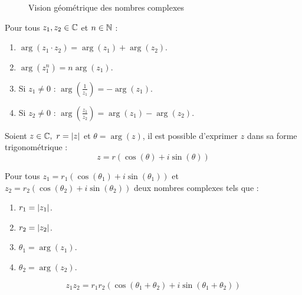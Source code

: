 \begin{figure}[!h]
	\centering
	\caption{Vision géométrique des nombres complexes}
\end{figure}

\begin{proposition}
	Pour tous $z_1, z_2 \in \mathbb{C}$ et $n \in \mathbb{N}$ :
	\begin{enumerate}
		\item $\arg(z_1 \cdot z_2) = \arg(z_1) + \arg(z_2)$.
		\item $\arg(z_1^n) = n \arg(z_1)$.
		\item Si $z_1 \neq 0$ : $\arg \left(\frac{1}{z_1} \right) = - \arg(z_1)$.
		\item Si $z_2 \neq 0$ : $\arg \left( \frac{z_1}{z_2} \right) = \arg(z_1) - \arg(z_2)$.
	\end{enumerate}
\end{proposition}

\begin{definition}
	Soient $z \in \mathbb{C},\ r = \abs{z}$ et $\theta = \arg(z)$, il est possible d'exprimer $z$ dans sa forme trigonométrique :
	\[ z = r \left( \cos(\theta) + i \sin(\theta) \right) \]
\end{definition}

\begin{proposition}
	Pour tous $z_1 = r_1 \left( \cos(\theta_1) + i \sin(\theta_1) \right)$ et $z_2 = r_2 \left( \cos(\theta_2) + i \sin(\theta_2) \right)$ deux nombres complexes tels que :
	\begin{enumerate}
			\item $r_1 = \abs{z_1}$.
			\item $r_2 = \abs{z_2}$.
			\item $\theta_1 = \arg(z_1)$.
			\item $\theta_2 = \arg(z_2)$.
		\end{enumerate}
	\[ z_1 z_2 = r_1 r_2 \left( \cos(\theta_1+\theta_2) + i \sin(\theta_1+ \theta_2) \right) \]
\end{proposition}

